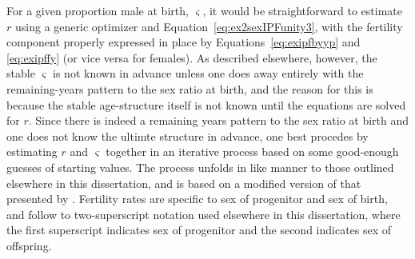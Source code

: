 \label{sec:rexIPFfindr}
For a given proportion male at birth, $\varsigma$, it would be straightforward
to estimate $r$ using a generic optimizer and
Equation~\eqref{eq:ex2sexIPFunity3}, with the fertility component properly
expressed in place by Equations~\eqref{eq:exipfbyyp} and \eqref{eq:exipffy} (or
vice versa for females). As described elsewhere, however, the stable $\varsigma$
is not known in advance unless one does away entirely with the remaining-years
pattern to the sex ratio at birth, and the reason for this is because the stable
age-structure itself is not known until the equations are solved for $r$.
Since there is indeed a remaining years pattern to the sex ratio at birth and
one does not know the ultimte structure in advance, one best procedes by
estimating $r$ and $\varsigma$ together in an iterative process based on some 
good-enough guesses of starting values. The process unfolds in like manner to 
those outlined elsewhere in this dissertation, and is based on a modified version 
of that presented by \citet{coale1957new}.
Fertility rates are specific to sex of progenitor and sex of birth, and follow
to two-superscript notation used elsewhere in this dissertation, where the first
superscript indicates sex of progenitor and the second indicates sex of
offspring.

